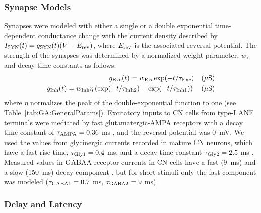 \subsubsection{Synapse Models}

Synapses were modeled with either a single or a double exponential
time-dependent conductance change with the current density described
by $I_{{\rm SYN}} (t)=g_{{\rm SYN}} (t)(V-E_{{\rm rev}} )$, where
$E_{\rm rev}$ is the associated reversal potential. The strength of
the synapses was determined by a normalized weight parameter, $w$, and
decay time-constants as follows:
\begin{eqnarray}
  \label{eq:GA:11}
  g_{{\rm Exc}} (t)=w_{{\rm Exc}} {\rm exp}(-t/\tau _{{\rm Exc}} ) \quad (\mu\mathrm{S}) \\
  \label{eq:GA:12} g_{{\rm Inh}} (t)=w_{{\rm Inh}} \eta \left({\rm exp}(-t/\tau_{{\rm Inh2}} )-{\rm exp}(-t/\tau _{{\rm Inh1}} )\right) \quad (\mu\mathrm{S}) 
\end{eqnarray}
\noindent where $\eta$ normalizes the peak of the double-exponential
function to one (see Table~\ref{tab:GA:GeneralParams}). Excitatory inputs to CN cells
from type-I ANF terminals were mediated by fast glutamatergic-AMPA
receptors with a decay time constant of $\tau _{{\rm AMPA}} = 0.36$ ms
\citep{Gardner:2000,GardnerTrussellEtAl:1999}, and the reversal
potential was 0~mV. We used the values from glycinergic currents
recorded in mature CN neurons, which have a fast rise time, $\tau
_{{\rm Gly1}} = 0.4$ ms, and a decay time constant $\tau _{{\rm Gly2}}
= 2.5$ ms
\citep{AwatramaniTurecekEtAl:2005,HartyManis:1998,LeaoOleskevichEtAl:2004,LimOleskevichEtAl:2003}.
Measured values in GABAA receptor currents in CN cells have a fast
(9~ms) and a slow (150~ms) decay component
\citep{AwatramaniTurecekEtAl:2005,DavisYoung:2000}, but for short
stimuli only the fast component was modeled ($\tau _{{\rm GABA1}}
=0.7$ ms, $\tau _{{\rm GABA2}} =9$ ms).

\subsubsection{Delay and Latency}

